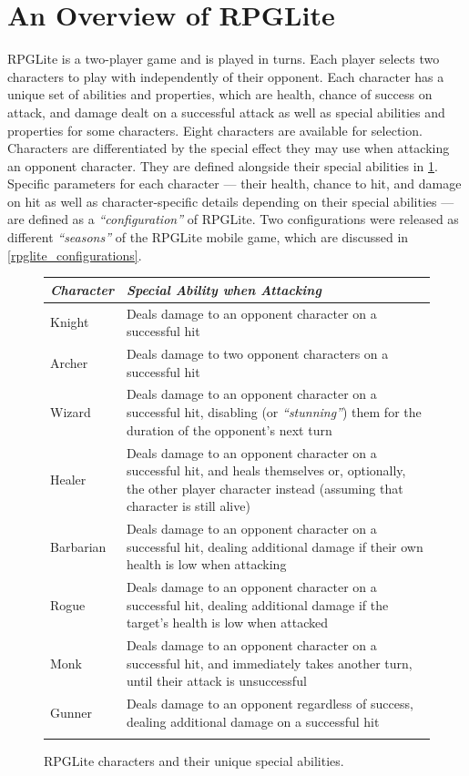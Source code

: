\section{An Overview of RPGLite}
\label{sec:rpglite_overview}

RPGLite is a two-player game and is played in turns. Each player selects two
characters to play with independently of their opponent. Each character has a
unique set of abilities and properties, which are health, chance of success on
attack, and damage dealt on a successful attack as well as special abilities and
properties for some characters. Eight characters are available for selection.
Characters are differentiated by the special effect they may use when attacking
an opponent character. They are defined alongside their special abilities in
\cref{fig:chars_and_their_abilities}. Specific parameters for each character ---
their health, chance to hit, and damage on hit as well as character-specific
details depending on their special abilities --- are defined as a
\emph{``configuration''} of RPGLite. Two configurations were released as
different \emph{``seasons''} of the RPGLite mobile game, which are discussed in
\cref{rpglite_configurations}.

\begin{figure}
  \centering
\begin{tabular}{@{}lp{}@{}}
  \toprule{}
  \emph{Character} & \emph{Special Ability when Attacking}\\
  \midrule{}
  Knight & Deals damage to an opponent character on a successful
  hit \tabularnewline{} 
  \rule{0pt}{2em}Archer & Deals damage to two opponent
  characters on a successful hit \tabularnewline{} 
  \rule{0pt}{2em}Wizard &
  Deals damage to an opponent character on a successful hit, disabling (or
  \emph{``stunning''}) them for the duration of the opponent's next
  turn\tabularnewline{} 
  \rule{0pt}{2em}Healer & Deals damage to an opponent
  character on a successful hit, and heals themselves or, optionally, the other
  player character instead (assuming that character is still
  alive)\tabularnewline{} 
  \rule{0pt}{2em}Barbarian & Deals damage to an opponent
  character on a successful hit, dealing additional damage if their own health
  is low when attacking\tabularnewline{} 
  \rule{0pt}{2em}Rogue & Deals damage to
  an opponent character on a successful hit, dealing additional damage if the
  target's health is low when attacked\tabularnewline{} 
  \rule{0pt}{2em}Monk &
  Deals damage to an opponent character on a successful hit, and immediately
  takes another turn, until their attack is unsuccessful\tabularnewline{}
  \rule{0pt}{2em}Gunner & Deals damage to an opponent regardless of success,
  dealing additional damage on a successful hit\\
\bottomrule{}
\end{tabular}
\caption{RPGLite characters and their unique special abilities.}
\label{fig:chars_and_their_abilities}
\end{figure}

